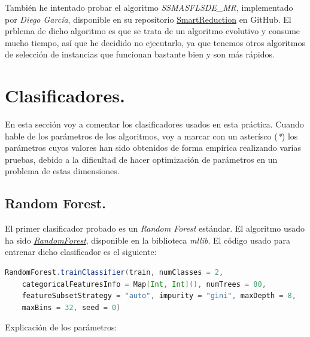 \documentclass[11pt]{article}
\begin{document}
También he intentado probar el algoritmo \textit{SSMASFLSDE\_MR}, implementado por \textit{Diego García}, disponible en su repositorio \href{https://github.com/djgarcia/SmartReduction}{SmartReduction} en GitHub. El prblema de dicho algoritmo es que se trata de un algoritmo evolutivo y consume mucho tiempo, así que he decidido no ejecutarlo, ya que tenemos otros algoritmos de selección de instancias que funcionan bastante bien y son más rápidos.

\section{Clasificadores.}

En esta sección voy a comentar los clasificadores usados en esta práctica. Cuando hable de los parámetros de los algoritmos, voy a marcar con un asterísco (\textit{*}) los parámetros cuyos valores han sido obtenidos de forma empírica realizando varias pruebas, debido a la dificultad de hacer optimización de parámetros en un problema de estas dimensiones.

\subsection{Random Forest.}

El primer clasificador probado es un \textit{Random Forest} estándar. El algoritmo usado ha sido \href{https://spark.apache.org/docs/2.2.0/api/scala/index.html#org.apache.spark.mllib.tree.RandomForest}{\textit{RandomForest}}, disponible en la biblioteca \textit{mllib}. El código usado para entrenar dicho clasificador es el siguiente:

\begin{lstlisting}[frame=single, language=scala, xleftmargin=.25in, basicstyle=\small, upquote=true, breaklines = true]
RandomForest.trainClassifier(train, numClasses = 2, 
	categoricalFeaturesInfo = Map[Int, Int](), numTrees = 80, 
	featureSubsetStrategy = "auto", impurity = "gini", maxDepth = 8, 
	maxBins = 32, seed = 0)
\end{lstlisting}

Explicación de los parámetros:
\end{document}
